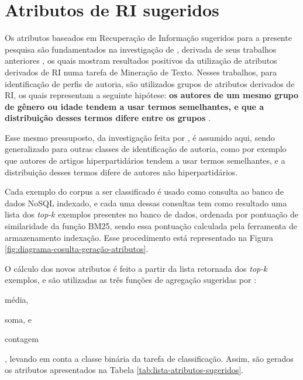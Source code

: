  



\section{Atributos de RI sugeridos}  \label{sec:Atributos-de-RI-sugeridos}
    Os atributos baseados em Recuperação de Informação sugeridos para a presente pesquisa são fundamentados na investigação de , derivada de seus trabalhos anteriores \cite{WEREN_CLEF_2014,WEREN_ARTIGO_2014}, os quais mostram resultados positivos da utilização de atributos derivados de RI numa tarefa de Mineração de Texto.
    Nesses trabalhos, para identificação de perfis de autoria, são utilizados grupos de atributos derivados de RI, os quais representam a seguinte hipótese: \textbf{os autores de um mesmo grupo de gênero ou idade tendem a usar termos semelhantes, e que a distribuição desses termos difere entre os grupos} \cite[p.~20]{WEREN_MESTRADO_2014}.
    
    Esse mesmo pressuposto, da investigação feita por , é assumido aqui, sendo generalizado para outras classes de identificação de autoria, como por exemplo que autores de artigos hiperpartidários tendem a usar termos semelhantes, e a distribuição desses termos difere de autores não hiperpartidários.
    
    
    
    Cada exemplo do corpus a ser classificado é usado como consulta ao banco de dados NoSQL indexado, e cada uma dessas consultas tem como resultado uma lista dos \textit{top-$k$} exemplos presentes no banco de dados, ordenada por pontuação de similaridade da função BM25, sendo essa pontuação calculada pela ferramenta de armazenamento indexação. 
    Esse procedimento está representado na Figura \ref{fig:diagrama-cosulta-geração-atributos}.
    
    O cálculo dos novos atributos é feito a partir da lista retornada dos \textit{top-$k$} exemplos, e são utilizadas as três funções de agregação sugeridas por :
    \begin{enumerate*}[label=(\alph*)]
        \item média,
        \item soma, e
        \item contagem
    \end{enumerate*}, 
    levando em conta a classe binária da tarefa de classificação. 
    Assim, são gerados os atributos apresentados na Tabela \ref{tab:lista-atributos-sugeridos}.
    
